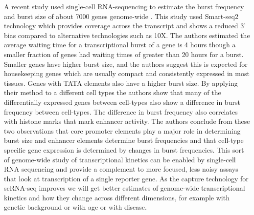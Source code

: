 A recent study used single-cell RNA-sequencing to estimate the burst frequency and burst size of about 7000 genes genome-wide \cite{larsson2019n}. This study used Smart-seq2 technology which provides coverage across the transcript and shows a reduced 3' bias compared to alternative technologies such as 10X. \cite{picelli2013nm} The authors estimated the average waiting time for a transcriptional burst of a gene is 4 hours though a smaller fraction of genes had waiting times of greater than 20 hours for a burst. Smaller genes have higher burst size, and the authors suggest this is expected for housekeeping genes which are usually compact and consistently expressed in most tissues. Genes with TATA elements also have a higher burst size. By applying their method to a different cell types the authors show that many of the differentially expressed genes between cell-types also show a difference in burst frequency between cell-types. The difference in burst frequency also correlates with histone marks that mark enhancer activity. The authors conclude from these two observations that core promoter elements play a major role in determining burst size and enhancer elements determine burst frequencies and that cell-type specific gene expression is determined by changes in burst frequencies. This sort of genome-wide study of transcriptional kinetics can be enabled by single-cell RNA sequencing and provide a complement to more focused, less noisy assays that look at transcription of a single reporter gene. As the capture technology for scRNA-seq improves we will get better estimates of genome-wide transcriptional kinetics and how they change across different dimensions, for example with genetic background or with age or with disease.


